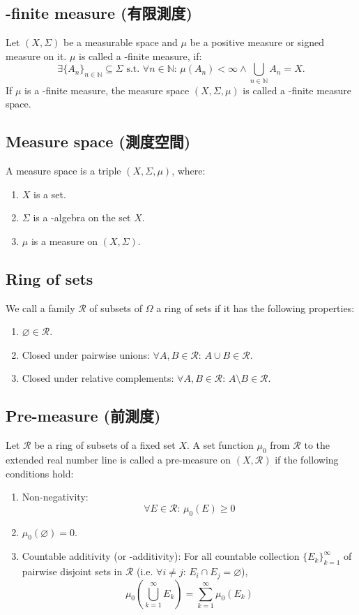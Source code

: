 \documentclass[a4paper,12pt]{article}
\begin{document}
\subsection{\text{\textsigma}-finite measure (\text{\textsigma}有限測度)}
Let $(X,\Sigma)$ be a measurable space and $\mu$ be a positive measure or signed measure on it. $\mu$ is called a \text{\textsigma}-finite measure, if:
\[\exists\{A_n\}_{n\in\mathbb{N}}\subseteq\Sigma\text{ s.t. }\forall n\in\mathbb{N}:\,\mu(A_n)<\infty\land\bigcup_{n\in\mathbb{N}}A_n=X.\]
If $\mu$ is a \text{\textsigma}-finite measure, the measure space $(X,\Sigma,\mu)$ is called a \text{\textsigma}-finite measure space.
\subsection{Measure space (測度空間)}
A measure space is a triple $(X,\Sigma,\mu)$, where:
\begin{enumerate}
\item $X$ is a set.
\item $\Sigma$ is a \text{\textsigma}-algebra on the set $X$. 
\item $\mu$ is a measure on $(X,\Sigma)$.
\end{enumerate}
\subsection{Ring of sets}
We call a family $\mathcal{R}$ of subsets of $\Omega$ a ring of sets if it has the following properties:
\begin{enumerate}
\item $\varnothing\in\mathcal{R}$.
\item Closed under pairwise unions: $\forall A,B\in\mathcal{R}:\,A\cup B\in\mathcal{R}$.
\item Closed under relative complements: $\forall A,B\in\mathcal{R}:\,A\setminus B\in\mathcal{R}$.
\end{enumerate}
\subsection{Pre-measure (前測度)}
Let $\mathcal{R}$ be a ring of subsets of a fixed set $X$. A set function $\mu_0$ from $\mathcal{R}$ to the extended real number line is called a pre-measure on $(X,\mathcal{R})$ if the following conditions hold:
\begin{enumerate}
\item Non-negativity: \[\forall E\in\mathcal{R}:\,\mu_0(E)\geq 0\]
\item $\mu_0(\varnothing )=0$.
\item Countable additivity (or \text{\textsigma}-additivity): For all countable collection $\{E_k\}_{k=1}^\infty$ of pairwise disjoint sets in $\mathcal{R}$ (i.e. $\forall i\neq j:\,E_i\cap E_j=\varnothing$),
\[\mu_0\left(\bigcup_{k=1}^\infty E_k\right)=\sum_{k=1}^\infty\mu_0(E_k)\]
\end{enumerate}
\end{document}
